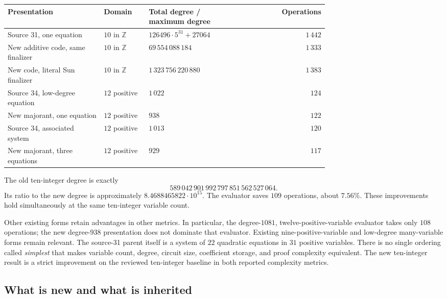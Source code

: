 \documentclass[11pt,letterpaper]{article}
\newcommand{\Z}{\mathbb Z}
\theoremstyle{remark}
\begin{document}
\begin{center}
\small
\begin{tabular}{@{}p{0.30\linewidth}p{0.14\linewidth}p{0.29\linewidth}r@{}}
\toprule
Presentation & Domain & Total degree / maximum degree & Operations\\
\midrule
Source 31, one equation & \(10\) in \(\Z\)
 & \(126496\cdot5^{31}+27064\) & \(1\,442\)\\
New additive code, same finalizer & \(10\) in \(\Z\)
 & \(69\,554\,088\,184\) & \(1\,333\)\\
New code, literal Sun finalizer & \(10\) in \(\Z\)
 & \(1\,323\,756\,220\,880\) & \(1\,383\)\\
\midrule
Source 34, low-degree equation & \(12\) positive & \(1\,022\) & \(124\)\\
New majorant, one equation & \(12\) positive & \(938\) & \(122\)\\
Source 34, associated system & \(12\) positive & \(1\,013\) & \(120\)\\
New majorant, three equations & \(12\) positive & \(929\) & \(117\)\\
\bottomrule
\end{tabular}
\end{center}

The old ten-integer degree is exactly
\[
589\,042\,901\,992\,797\,851\,562\,527\,064.
\]
Its ratio to the new degree is approximately
\(8.4688465822\cdot10^{15}\). The evaluator saves \(109\) operations,
about \(7.56\%\). These improvements hold simultaneously at the same
ten-integer variable count.

Other existing forms retain advantages in other metrics. In particular,
the degree-\(1081\), twelve-positive-variable evaluator takes only
\(108\) operations; the new degree-\(938\) presentation does not dominate
that evaluator. Existing nine-positive-variable and low-degree
many-variable forms remain relevant. The source-31 parent itself is a
system of \(22\) quadratic equations in \(31\) positive variables. There
is no single ordering called \emph{simplest} that makes variable count,
degree, circuit size, coefficient storage, and proof complexity equivalent.
The new ten-integer result is a strict improvement on the reviewed
ten-integer baseline in both reported complexity metrics.

\subsection{What is new and what is inherited}
\end{document}

